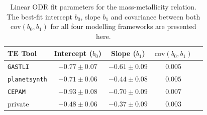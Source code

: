 \begin{table}[H]
\centering
\begin{tabular}{lcccc}
\hline
\hline
TE Tool              & Intercept ($b_0$) & Slope ($b_1$)    & $\text{cov}(b_0, b_1)$ \\
\hline
\texttt{GASTLI}      & $-0.77 \pm 0.07$  & $-0.61 \pm 0.09$ & $0.005$  \\
\texttt{planetsynth} & $-0.71 \pm 0.06$  & $-0.44 \pm 0.08$ & $0.005$ \\
\texttt{CEPAM}       & $-0.93 \pm 0.08$  & $-0.70 \pm 0.09$ & $0.007$ \\
private              & $-0.48 \pm 0.06$  & $-0.37 \pm 0.09$  & $0.003$     \\
\hline
\end{tabular}

\caption{Linear ODR fit parameters for the mass-metallicity relation. The best-fit intercept $b_0$, slope $b_1$ and covariance between both $\text{cov}(b_0,b_1)$ for all four modelling frameworks are presented here.}
\label{tab:fit_results}

\end{table}